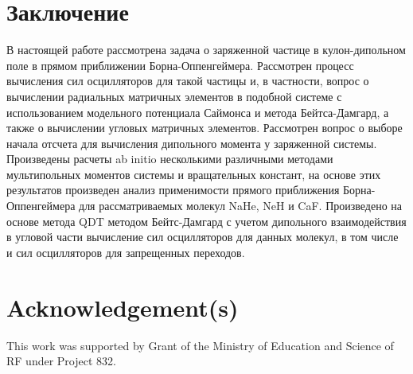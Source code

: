 \documentclass[]{interact}
\theoremstyle{plain}%
\theoremstyle{definition}
\theoremstyle{remark}
\begin{document}
\section{Заключение}
В настоящей работе рассмотрена задача о заряженной частице в кулон-дипольном поле в прямом приближении Борна-Оппенгеймера. Рассмотрен процесс вычисления сил осцилляторов для такой частицы и, в частности, вопрос о вычислении радиальных матричных элементов в подобной системе с использованием модельного потенциала Саймонса и метода Бейтса-Дамгард, а также о вычислении угловых матричных элементов. Рассмотрен вопрос о выборе начала отсчета для вычисления дипольного момента у заряженной системы.
Произведены расчеты ab initio несколькими различными методами мультипольных моментов системы и вращательных констант, на основе этих результатов произведен анализ применимости прямого приближения Борна-Оппенгеймера для рассматриваемых молекул NaHe, NeH и CaF. Произведено на основе метода QDT методом Бейтс-Дамгард с учетом дипольного взаимодействия в угловой части вычисление сил осцилляторов для данных молекул, в том числе и сил осцилляторов для запрещенных переходов.



\section*{Acknowledgement(s)}

This work was supported by Grant of the Ministry of Education and Science of RF under Project 832.
\end{document}
